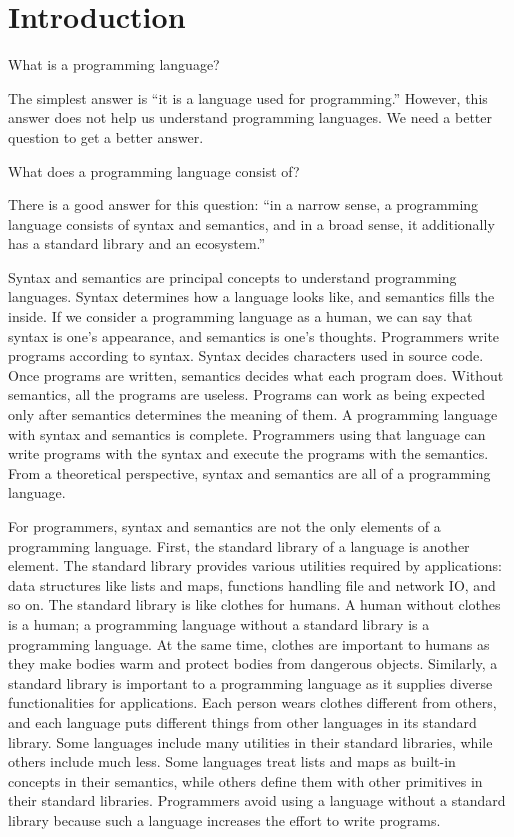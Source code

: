\chapter{Introduction}

What is a programming language?

The simplest answer is ``it is a language used for programming.'' However, this
answer does not help us understand programming languages. We need a better
question to get a better answer.

What does a programming language consist of?

There is a good answer for this question: ``in a narrow sense, a programming
language consists of syntax and semantics, and in a broad sense, it additionally
has a standard library and an ecosystem.''

Syntax and semantics are principal concepts to understand programming languages.
Syntax determines how a language looks like, and semantics fills the inside. If
we consider a programming language as a human, we can say that syntax is one’s
appearance, and semantics is one’s thoughts. Programmers write programs
according to syntax. Syntax decides characters used in source code. Once programs
are written, semantics decides what each program does. Without semantics, all
the programs are useless. Programs can work as being expected only after
semantics determines the meaning of them. A programming language with syntax and
semantics is complete. Programmers using that language can write programs with
the syntax and execute the programs with the semantics. From a theoretical
perspective, syntax and semantics are all of a programming language.

For programmers, syntax and semantics are not the only elements of a programming
language. First, the standard library of a language is another element. The
standard library provides various utilities required by applications: data
structures like lists and maps, functions handling file and network IO, and so
on. The standard library is like clothes for humans. A human without clothes is
a human; a programming language without a standard library is a programming
language. At the same time, clothes are important to humans as they make bodies
warm and protect bodies from dangerous objects. Similarly, a standard library is
important to a programming language as it supplies diverse functionalities for
applications. Each person wears clothes different from others, and each language
puts different things from other languages in its standard library. Some
languages include many utilities in their standard libraries, while others
include much less. Some languages treat lists and maps as built-in concepts in
their semantics, while others define them with other primitives in their standard libraries.
Programmers avoid using a language without a standard library because such a
language increases the effort to write programs.

